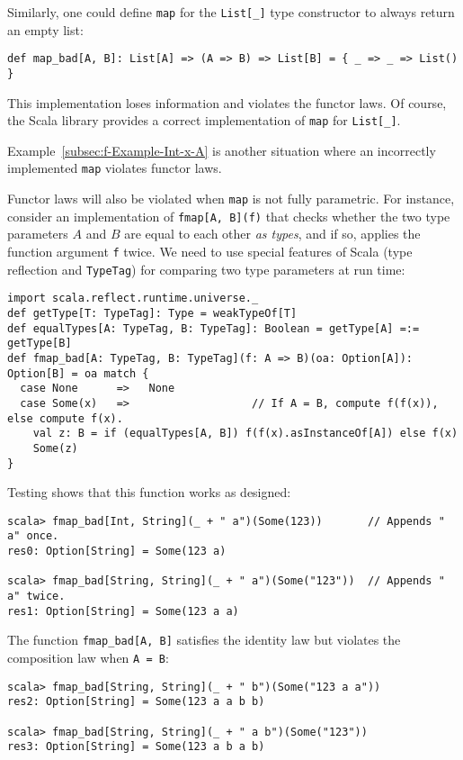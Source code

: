 Similarly, one could define \lstinline!map! for the \lstinline!List[_]!
type constructor to always return an empty list:
\begin{lstlisting}
def map_bad[A, B]: List[A] => (A => B) => List[B] = { _ => _ => List() }
\end{lstlisting}
This implementation loses information and violates the functor laws.
Of course, the Scala library provides a correct implementation of
\lstinline!map! for \lstinline!List[_]!.

Example~\ref{subsec:f-Example-Int-x-A} is another situation where
an incorrectly implemented \lstinline!map! violates functor laws.

Functor laws will also be violated when \lstinline!map! is not fully
parametric. For instance, consider an implementation of \lstinline!fmap[A, B](f)!
that checks whether the two type parameters $A$ and $B$ are equal
to each other \emph{as types}, and if so, applies the function argument
\lstinline!f! twice. We need to use special features of Scala (type
reflection and \lstinline!TypeTag!) for comparing two type parameters
at run time:
\begin{lstlisting}
import scala.reflect.runtime.universe._
def getType[T: TypeTag]: Type = weakTypeOf[T]
def equalTypes[A: TypeTag, B: TypeTag]: Boolean = getType[A] =:= getType[B]
def fmap_bad[A: TypeTag, B: TypeTag](f: A => B)(oa: Option[A]): Option[B] = oa match {
  case None      =>   None
  case Some(x)   =>                   // If A = B, compute f(f(x)), else compute f(x).
    val z: B = if (equalTypes[A, B]) f(f(x).asInstanceOf[A]) else f(x)
    Some(z)
}
\end{lstlisting}
Testing shows that this function works as designed:
\begin{lstlisting}
scala> fmap_bad[Int, String](_ + " a")(Some(123))       // Appends " a" once.
res0: Option[String] = Some(123 a)

scala> fmap_bad[String, String](_ + " a")(Some("123"))  // Appends " a" twice.
res1: Option[String] = Some(123 a a)
\end{lstlisting}
The function \lstinline!fmap_bad[A, B]! satisfies the identity law
but violates the composition law when \lstinline!A = B!:
\begin{lstlisting}
scala> fmap_bad[String, String](_ + " b")(Some("123 a a"))
res2: Option[String] = Some(123 a a b b)

scala> fmap_bad[String, String](_ + " a b")(Some("123"))
res3: Option[String] = Some(123 a b a b)
\end{lstlisting}


